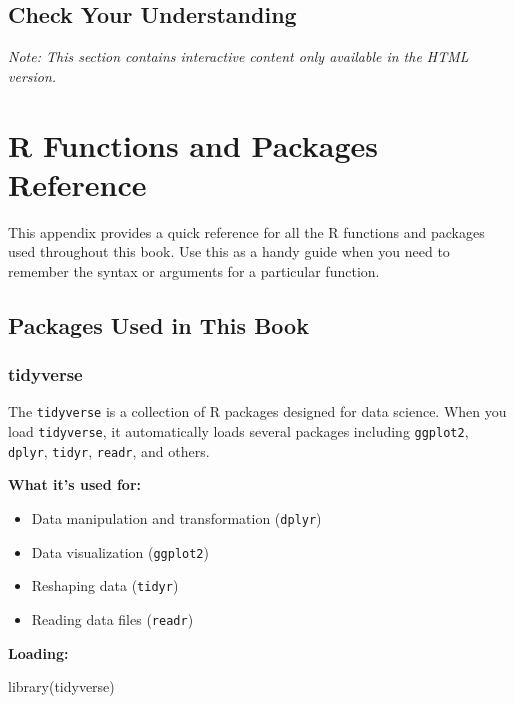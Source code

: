 \documentclass[
  letterpaper,
  DIV=11,
  numbers=noendperiod]{scrreprt}
\newenvironment{Shaded}{\begin{snugshade}}{\end{snugshade}}
\newcommand{\FunctionTok}[1]{\textcolor[rgb]{0.28,0.35,0.67}{#1}}
\newcommand{\NormalTok}[1]{\textcolor[rgb]{0.00,0.23,0.31}{#1}}
\providecommand{\tightlist}{%
  \setlength{\itemsep}{0pt}\setlength{\parskip}{0pt}}
\begin{document}
\section{Check Your Understanding}\label{check-your-understanding-15}

\emph{Note: This section contains interactive content only available in
the HTML version.}

\chapter{R Functions and Packages Reference}\label{sec-r-reference}

This appendix provides a quick reference for all the R functions and
packages used throughout this book. Use this as a handy guide when you
need to remember the syntax or arguments for a particular function.

\section{Packages Used in This Book}\label{packages-used-in-this-book}

\subsection{tidyverse}\label{tidyverse}

The \texttt{tidyverse} is a collection of R packages designed for data
science. When you load \texttt{tidyverse}, it automatically loads
several packages including \texttt{ggplot2}, \texttt{dplyr},
\texttt{tidyr}, \texttt{readr}, and others.

\textbf{What it's used for:}

\begin{itemize}
\tightlist
\item
  Data manipulation and transformation (\texttt{dplyr})
\item
  Data visualization (\texttt{ggplot2})
\item
  Reshaping data (\texttt{tidyr})
\item
  Reading data files (\texttt{readr})
\end{itemize}

\textbf{Loading:}

\begin{Shaded}
\begin{Highlighting}[]
\FunctionTok{library}\NormalTok{(tidyverse)}
\end{Highlighting}
\end{Shaded}
\end{document}
